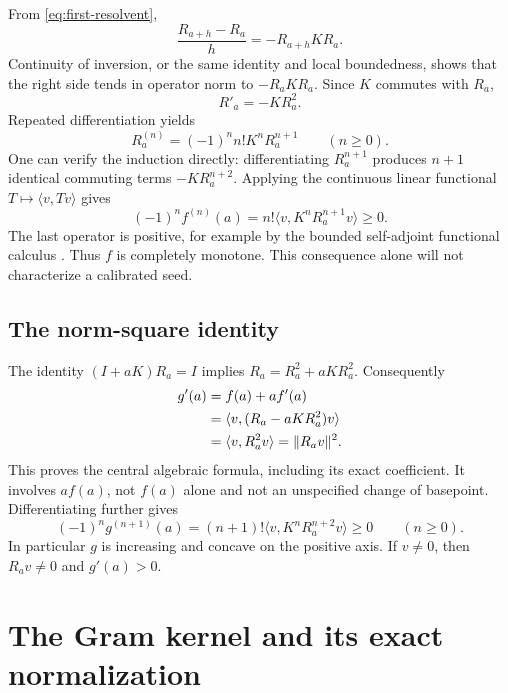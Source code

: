 \documentclass[11pt,a4paper]{article}
\numberwithin{equation}{section}
\theoremstyle{definition}
\theoremstyle{remark}
\newcommand{\ip}[2]{\langle #1,#2\rangle}
\newcommand{\norm}[1]{\lVert #1\rVert}
\begin{document}
From \eqref{eq:first-resolvent},
\[
\frac{R_{a+h}-R_a}{h}=-R_{a+h}KR_a.
\]
Continuity of inversion, or the same identity and local boundedness, shows
that the right side tends in operator norm to $-R_aKR_a$.
Since $K$ commutes with $R_a$,
\begin{equation}\label{eq:Rprime}
R'_a=-KR_a^2.
\end{equation}
Repeated differentiation yields
\begin{equation}\label{eq:Rderivatives}
R_a^{(n)}=(-1)^n n!K^nR_a^{n+1}\qquad(n\geq0).
\end{equation}
One can verify the induction directly: differentiating $R_a^{n+1}$
produces $n+1$ identical commuting terms
$-KR_a^{n+2}$.
Applying the continuous linear functional $T\mapsto\ip v{Tv}$ gives
\begin{equation}\label{eq:fderivatives}
(-1)^n f^{(n)}(a)=n!\ip v{K^nR_a^{n+1}v}\geq0.
\end{equation}
The last operator is positive, for example by the bounded self-adjoint
functional calculus \cite{williams}. Thus $f$ is completely monotone.
This consequence alone will not characterize a calibrated seed.

\subsection{The norm-square identity}

The identity $(I+aK)R_a=I$ implies
$R_a=R_a^2+aKR_a^2$. Consequently
\begin{align}
g'(a)&=f(a)+af'(a)\notag\\
&=\ip v{(R_a-aKR_a^2)v}\notag\\
&=\ip v{R_a^2v}=\norm{R_av}^2.\label{eq:norm-square}
\end{align}
This proves the central algebraic formula, including its exact coefficient.
It involves $af(a)$, not $f(a)$ alone and not an unspecified change of
basepoint. Differentiating further gives
\begin{equation}\label{eq:gderivatives}
(-1)^n g^{(n+1)}(a)
=(n+1)!\ip v{K^nR_a^{n+2}v}\geq0\qquad(n\geq0).
\end{equation}
In particular $g$ is increasing and concave on the positive axis.
If $v\ne0$, then $R_av\ne0$ and $g'(a)>0$.

\section[The Gram kernel]{The Gram kernel and its exact normalization}\label{sec:gram}
\end{document}
